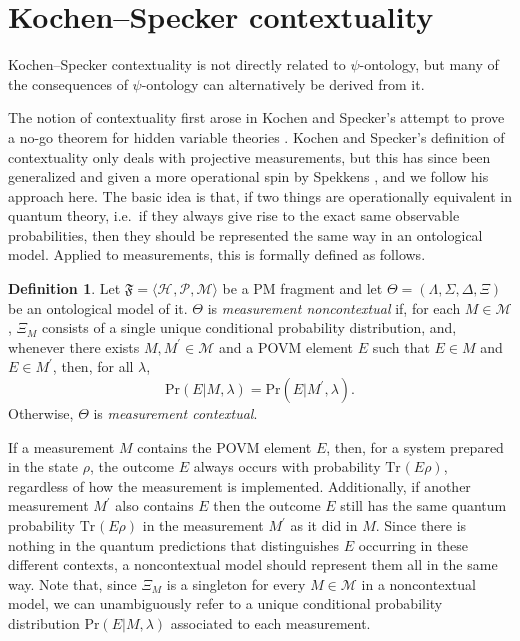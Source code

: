 \documentclass[DIV=calc,paper=a4,fontsize=11pt,twocolumn]{scrartcl} %
\theoremstyle{definition}
\newtheorem{definition}{Definition}[section]
\theoremstyle{plain}
\newcommand{\Hilb}[1][]{\ensuremath{\mathcal{H}_{#1}}}
\newcommand{\Tr}[2][]{\ensuremath{\text{Tr}_{#1} \left ( #2 \right )}}
\begin{document}
\section{Kochen--Specker contextuality}

\label{App:KS}

Kochen--Specker contextuality is not directly related to
$\psi$-ontology, but many of the consequences of $\psi$-ontology can
alternatively be derived from it.

The notion of contextuality first arose in Kochen and Specker's
attempt to prove a no-go theorem for hidden variable theories
\cite{Kochen1967}.  Kochen and Specker's definition of contextuality
only deals with projective measurements, but this has since been
generalized and given a more operational spin by Spekkens
\cite{Spekkens2005}, and we follow his approach here.  The basic idea
is that, if two things are operationally equivalent in quantum theory,
i.e.\ if they always give rise to the exact same observable
probabilities, then they should be represented the same way in an
ontological model.  Applied to measurements, this is formally defined
as follows.

\begin{definition}
Let $\mathfrak{F} = \langle \Hilb, \mathcal{P}, \mathcal{M} \rangle$
be a PM fragment and let $\Theta = (\Lambda, \Sigma, \Delta, \Xi)$
be an ontological model of it.  $\Theta$ is \emph{measurement
noncontextual} if, for each $M \in \mathcal{M}$, $\Xi_M$ consists
of a single unique conditional probability distribution, and,
whenever there exists $M,M^{\prime} \in \mathcal{M}$ and a POVM
element $E$ such that $E \in M$ and $E \in M^{\prime}$, then, for
all $\lambda$,
\begin{equation}
\text{Pr}(E|M,\lambda) = \text{Pr}(E|M^{\prime},\lambda).
\end{equation}
Otherwise, $\Theta$ is \emph{measurement contextual}.
\end{definition}

If a measurement $M$ contains the POVM element $E$, then, for a system
prepared in the state $\rho$, the outcome $E$ always occurs with
probability $\Tr{E \rho}$, regardless of how the measurement is
implemented.  Additionally, if another measurement $M^{\prime}$ also
contains $E$ then the outcome $E$ still has the same quantum
probability $\Tr{E \rho}$ in the measurement $M^{\prime}$ as it did in
$M$.  Since there is nothing in the quantum predictions that
distinguishes $E$ occurring in these different contexts, a
noncontextual model should represent them all in the same way.  Note
that, since $\Xi_M$ is a singleton for every $M \in \mathcal{M}$ in a
noncontextual model, we can unambiguously refer to a unique
conditional probability distribution $\text{Pr}(E|M,\lambda)$
associated to each measurement.
\end{document}
